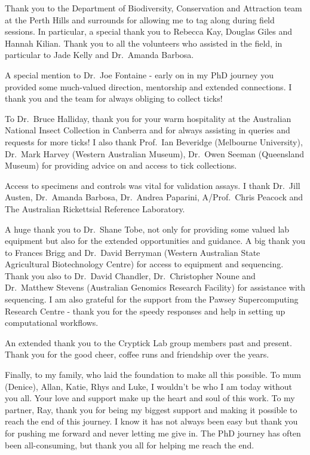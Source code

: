 \documentclass[a4paper, nobind]{templates/ociamthesis}
\begin{document}
\begin{romanpages}
\begin{acknowledgements}
  Thank you to the Department of Biodiversity, Conservation and Attraction team at the Perth Hills and surrounds for allowing me to tag along during field sessions. In particular, a special thank you to Rebecca Kay, Douglas Giles and Hannah Kilian.
  Thank you to all the volunteers who assisted in the field, in particular to Jade Kelly and Dr.~Amanda Barbosa.

  A special mention to Dr.~Joe Fontaine - early on in my PhD journey you provided some much-valued direction, mentorship and extended connections. I thank you and the team for always obliging to collect ticks!

  To Dr.~Bruce Halliday, thank you for your warm hospitality at the Australian National Insect Collection in Canberra and for always assisting in queries and requests for more ticks! I also thank Prof.~Ian Beveridge (Melbourne University), Dr.~Mark Harvey (Western Australian Museum), Dr.~Owen Seeman (Queensland Museum) for providing advice on and access to tick collections.

  Access to specimens and controls was vital for validation assays. I thank Dr.~Jill Austen, Dr.~Amanda Barbosa, Dr.~Andrea Paparini, A/Prof.~Chris Peacock and The Australian Rickettsial Reference Laboratory.

  A huge thank you to Dr.~Shane Tobe, not only for providing some valued lab equipment but also for the extended opportunities and guidance. A big thank you to Frances Brigg and Dr.~David Berryman (Western Australian State Agricultural Biotechnology Centre) for access to equipment and sequencing. Thank you also to Dr.~David Chandler, Dr.~Christopher Noune and Dr.~Matthew Stevens (Australian Genomics Research Facility) for assistance with sequencing. I am also grateful for the support from the Pawsey Supercomputing Research Centre - thank you for the speedy responses and help in setting up computational workflows.

  An extended thank you to the Cryptick Lab group members past and present. Thank you for the good cheer, coffee runs and friendship over the years.

  Finally, to my family, who laid the foundation to make all this possible.
  To mum (Denice), Allan, Katie, Rhys and Luke, I wouldn't be who I am today without you all. Your love and support make up the heart and soul of this work.
  To my partner, Ray, thank you for being my biggest support and making it possible to reach the end of this journey. I know it has not always been easy but thank you for pushing me forward and never letting me give in.
  The PhD journey has often been all-consuming, but thank you all for helping me reach the end.
\end{acknowledgements}



\end{romanpages}
\end{document}
